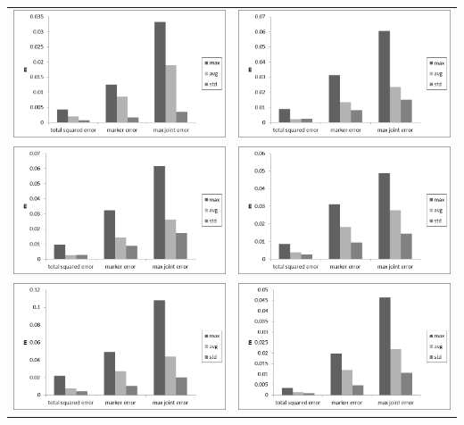 \begin{center}
    \begin{tabular}{cc}
        \includegraphics[width=.48\textwidth, keepaspectratio]{fig/ik-reg1.png} & \includegraphics[width=.48\textwidth, keepaspectratio]{fig/ik-reg2.png}\\[3pt]
        \includegraphics[width=.48\textwidth, keepaspectratio]{fig/ik-reg3.png} & \includegraphics[width=.48\textwidth, keepaspectratio]{fig/ik-reg4.png}\\[3pt]
        \includegraphics[width=.48\textwidth, keepaspectratio]{fig/ik-reg5.png} & \includegraphics[width=.48\textwidth, keepaspectratio]{fig/ik-reg6.png}
    \end{tabular}
    \label{tab:ik-error-regions}
\end{center}

